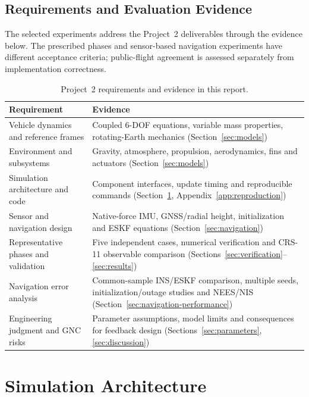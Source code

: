 \documentclass[11pt,letterpaper]{article}
\begin{document}
\subsection{Requirements and Evaluation Evidence}
The selected experiments address the Project~2 deliverables through the evidence below.
The prescribed phases and sensor-based navigation experiments have different acceptance
criteria; public-flight agreement is assessed separately from implementation correctness.
\begin{table}[!htbp]\centering\small
\caption{Project~2 requirements and evidence in this report.}\label{tab:requirements}
\begin{tabularx}{\textwidth}{lY}\toprule
Requirement & Evidence\\\midrule
Vehicle dynamics and reference frames & Coupled 6-DOF equations, variable mass properties,
rotating-Earth mechanics (Section~\ref{sec:models})\\
Environment and subsystems & Gravity, atmosphere, propulsion, aerodynamics, fins and
actuators (Section~\ref{sec:models})\\
Simulation architecture and code & Component interfaces, update timing and reproducible
commands (Section~\ref{sec:architecture}, Appendix~\ref{app:reproduction})\\
Sensor and navigation design & Native-force IMU, GNSS/radial height, initialization and
ESKF equations (Section~\ref{sec:navigation})\\
Representative phases and validation & Five independent cases, numerical verification
and CRS-11 observable comparison (Sections~\ref{sec:verification}--\ref{sec:results})\\
Navigation error analysis & Common-sample INS/ESKF comparison, multiple seeds,
initialization/outage studies and NEES/NIS (Section~\ref{sec:navigation-performance})\\
Engineering judgment and GNC risks & Parameter assumptions, model limits and consequences
for feedback design (Sections~\ref{sec:parameters}, \ref{sec:discussion})\\\bottomrule
\end{tabularx}
\end{table}
\FloatBarrier

\section{Simulation Architecture}\label{sec:architecture}
\end{document}
